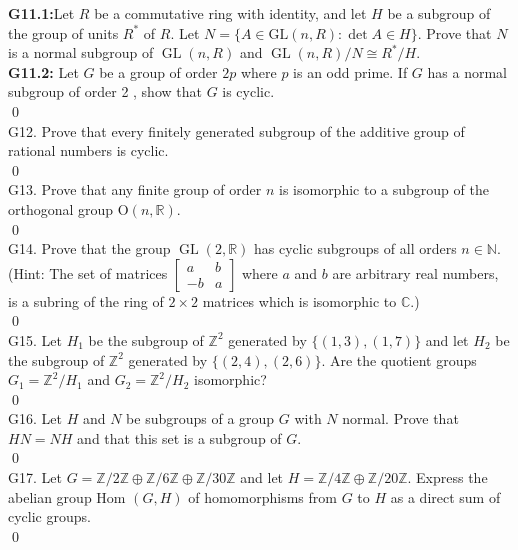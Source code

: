 \textbf{G11.1:}Let $R$ be a commutative ring with identity, and let $H$ be a subgroup of the group of units $R^{*}$ of $R$. Let $N=\{A \in \mathrm{GL}(n, R): \operatorname{det} A \in H\}$. Prove that $N$ is a normal subgroup of $\operatorname{GL}(n, R)$ and $\operatorname{GL}(n, R) / N \cong R^{*} / H$.\\
\textbf{G11.2:} Let $G$ be a group of order $2 p$ where $p$ is an odd prime. If $G$ has a normal subgroup of order 2 , show that $G$ is cyclic.\\
\soln
\qed\\
G12. Prove that every finitely generated subgroup of the additive group of rational numbers is cyclic.\\
\soln
\qed\\

G13. Prove that any finite group of order $n$ is isomorphic to a subgroup of the orthogonal group $\mathrm{O}(n, \mathbb{R})$.\\
\soln
\qed\\

G14. Prove that the group $\operatorname{GL}(2, \mathbb{R})$ has cyclic subgroups of all orders $n \in \mathbb{N}$. (Hint: The set of matrices $\left[\begin{array}{cc}a & b \\ -b & a\end{array}\right]$ where $a$ and $b$ are arbitrary real numbers, is a subring of the ring of $2 \times 2$ matrices which is isomorphic to $\mathbb{C}$.)\\
\soln
\qed\\

G15. Let $H_{1}$ be the subgroup of $\mathbb{Z}^{2}$ generated by $\{(1,3),(1,7)\}$ and let $H_{2}$ be the subgroup of $\mathbb{Z}^{2}$ generated by $\{(2,4),(2,6)\}$. Are the quotient groups $G_{1}=\mathbb{Z}^{2} / H_{1}$ and $G_{2}=\mathbb{Z}^{2} / H_{2}$ isomorphic?\\
\soln
\qed\\

G16. Let $H$ and $N$ be subgroups of a group $G$ with $N$ normal. Prove that $H N=N H$ and that this set is a subgroup of $G$.\\

\soln
\qed\\

G17. Let $G=\mathbb{Z} / 2 \mathbb{Z} \oplus \mathbb{Z} / 6 \mathbb{Z} \oplus \mathbb{Z} / 30 \mathbb{Z}$ and let $H=\mathbb{Z} / 4 \mathbb{Z} \oplus \mathbb{Z} / 20 \mathbb{Z}$. Express the abelian group Hom $(G, H)$ of homomorphisms from $G$ to $H$ as a direct sum of cyclic groups.\\
\soln
\qed\\

